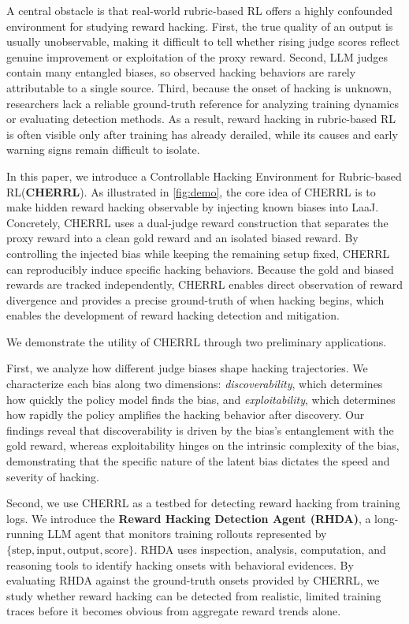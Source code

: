 \documentclass[11pt]{article}
\newcommand{\ourenv}{CHERRL\xspace}
\newcommand{\ourenvfull}{Controllable Hacking Environment for Rubric-based RL\xspace}
\begin{document}
A central obstacle is that real-world rubric-based RL offers a highly confounded environment for studying reward hacking. First, the true quality of an output is usually unobservable, making it difficult to tell whether rising judge scores reflect genuine improvement or exploitation of the proxy reward. Second, LLM judges contain many entangled biases, so observed hacking behaviors are rarely attributable to a single source. Third, because the onset of hacking is unknown, researchers lack a reliable ground-truth reference for analyzing training dynamics or evaluating detection methods. As a result, reward hacking in rubric-based RL is often visible only after training has already derailed, while its causes and early warning signs remain difficult to isolate.



In this paper, we introduce a \ourenvfull (\textbf{\ourenv}). As illustrated in \cref{fig:demo}, the core idea of \ourenv is to make hidden reward hacking observable by injecting known biases into LaaJ. Concretely, \ourenv uses a dual-judge reward construction that separates the proxy reward into a clean gold reward and an isolated biased reward. By controlling the injected bias while keeping the remaining setup fixed, \ourenv can reproducibly induce specific hacking behaviors. Because the gold and biased rewards are tracked independently, \ourenv enables direct observation of reward divergence and provides a precise ground-truth of when hacking begins, which enables the development of reward hacking detection and mitigation.






We demonstrate the utility of \ourenv through two preliminary applications. 

First, we analyze how different judge biases shape hacking trajectories. We characterize each bias along two dimensions: \textit{discoverability}, which determines how quickly the policy model finds the bias, and \textit{exploitability}, which determines how rapidly the policy amplifies the hacking behavior after discovery. Our findings reveal that discoverability is driven by the bias's entanglement with the gold reward, whereas exploitability hinges on the intrinsic complexity of the bias, demonstrating that the specific nature of the latent bias dictates the speed and severity of hacking.



Second, we use \ourenv as a testbed for detecting reward hacking from training logs. We introduce the \textbf{Reward Hacking Detection Agent (RHDA)}, a long-running LLM agent that monitors training rollouts represented by $\{\text{step}, \text{input}, \text{output}, \text{score}\}$. RHDA uses inspection, analysis, computation, and reasoning tools to identify hacking onsets with behavioral evidences. By evaluating RHDA against the ground-truth onsets provided by \ourenv, we study whether reward hacking can be detected from realistic, limited training traces before it becomes obvious from aggregate reward trends alone.
\end{document}
